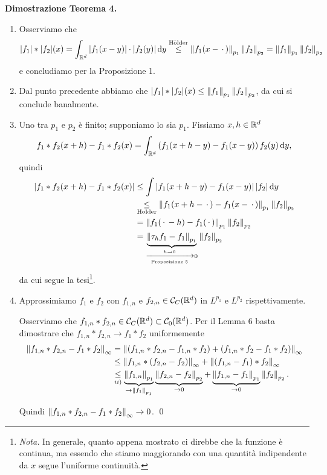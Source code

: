 \textbf{Dimostrazione Teorema 4.}
\begin{enumerate}
\item Osserviamo che
$$
|f_1| \ast |f_2|(x) = \int_{\mathbb R^d} |f_1(x-y)| \cdot |f_2(y)| \,\mathrm{d} y
\overset{\text{Hölder}}{\leq} \left\lVert f_1(x - \,\cdot\,) \right\rVert_{p_1} \left\lVert f_2 \right\rVert_{p_2}
= \left\lVert f_1 \right\rVert_{p_1} \left\lVert f_2 \right\rVert_{p_2}
$$
e concludiamo per la Proposizione 1.

\item Dal punto precedente abbiamo che $|f_1| \ast |f_2|(x) \leq \left\lVert f_1 \right\rVert_{p_1} \left\lVert f_2 \right\rVert_{p_2}$, da cui si conclude banalmente.

\item Uno tra $p_1$ e $p_2$ è finito; supponiamo lo sia $p_1$.
Fissiamo $x,h \in \mathbb R^d$
%
$$
	f_1 \ast f_2(x+h) - f_1 \ast f_2(x) = \int_{\mathbb R^d} \left( f_1(x+h-y) - f_1(x-y) \right) f_2(y) \,\mathrm{d} y,
$$
%
quindi
\begin{align*}
	\left| f_1 \ast f_2(x+h) - f_1 \ast f_2(x) \right|
	& \leq \int \left| f_1(x+h - y) - f_1(x - y) \right| | f_2| \,\mathrm{d} y  \\
	& \underset{\text{Holder}}{\leq} \left\lVert f_1(x+h - \,\cdot\,) - f_1(x - \,\cdot\,) \right\rVert_{p_1} \left\lVert f_2 \right\rVert_{p_2} \\
	& = \left\lVert f_1(\,\cdot\, - h) - f_1(\,\cdot\,) \right\rVert_{p_1} \left\lVert f_2 \right\rVert_{p_2} \\
	& = \underbrace{\left\lVert \tau_h f_1 - f_1 \right\rVert_{p_1}}_{\xrightarrow[\text{Proposizione 5}]{h \to 0} 0} \left\lVert f_2 \right\rVert_{p_2}
\end{align*}
da cui segue la tesi\footnote{\textit{Nota.} In generale, quanto appena mostrato ci direbbe che la funzione è continua, ma essendo che stiamo maggiorando con una quantità indipendente da $x$ segue l'uniforme continuità.}.

\item Approssimiamo $f_1$  e $f_2$ con $f_{1,n}$ e $f_{2,n} \in \mathcal{C}_C(\mathbb R^d)$ in $L^{p_1}$ e $L^{p_2}$ rispettivamente.

Osserviamo che $f_{1,n} \ast f_{2,n} \in \mathcal{C}_C(\mathbb R^d) \subset \mathcal{C}_0(\mathbb R^d)$.
Per il Lemma 6 basta dimostrare che $f_{1,n} \ast f_{2,n} \longrightarrow f_1 \ast f_2$ uniformemente
%
\begin{align*}
	\left\lVert f_{1,n} \ast f_{2,n} - f_1 \ast f_2 \right\rVert_\infty
	& = \left\lVert \left( f_{1,n} \ast f_{2,n} - f_{1,n} \ast f_2 \right) + \left( f_{1,n} \ast f_2 - f_1 \ast f_2 \right) \right\rVert_\infty \\
	& \leq \left\lVert f_{1,n} \ast \left( f_{2,n} - f_2 \right) \right\rVert_\infty + \left\lVert \left( f_{1,n} - f_1 \right) \ast f_2 \right\rVert_\infty \\
	& \underset{ii)}{\leq} \underbrace{\left\lVert f_{1,n} \right\rVert_{p_1}}_{\to \left\lVert f_1 \right\rVert_{p_1}} \underbrace{\left\lVert f_{2,n} - f_2 \right\rVert_{p_2}}_{\to 0} + \underbrace{\left\lVert f_{1,n} - f_1 \right\rVert_{p_1}}_{\to 0} \left\lVert f_2 \right\rVert_{p_2}.
\end{align*}

Quindi $\left\lVert f_{1,n} \ast f_{2,n} - f_1 \ast f_2 \right\rVert_\infty \to 0$.
\qed
\end{enumerate}

